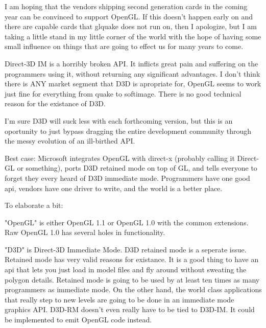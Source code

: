 \begin{allintypewriter}
\par
I am hoping that the vendors shipping second generation cards in the coming 
year can be convinced to support OpenGL. If this doesn't happen early on and
there are capable cards that glquake does not run on, then I apologize, but I am
taking a little stand in my little corner of the world with the hope of having 
some small influence on things that are going to effect us for many years to come.\\ 
\par
Direct-3D IM is a horribly broken API. It inflicts great pain and suffering on 
the programmers using it, without returning any significant advantages. I don't 
think there is ANY market segment that D3D is apropriate for, OpenGL seems to work
just fine for everything from quake to softimage. There is no good technical reason
for the existance of D3D.\\ 
\par
I'm sure D3D will suck less with each forthcoming version, but this is an oportunity 
to just bypass dragging the entire development community through the messy evolution 
of an ill-birthed API.\\ 
\par
Best case: Microsoft integrates OpenGL with direct-x (probably calling it Direct-GL 
or something), ports D3D retained mode on top of GL, and tells everyone to forget 
they every heard of D3D immediate mode. Programmers have one good api, vendors have 
one driver to write, and the world is a better place.\\ 
\par
To elaborate a bit:\\ 
\par
"OpenGL" is either OpenGL 1.1 or OpenGL 1.0 with the common extensions. Raw OpenGL 1.0
has several holes in functionality.\\ 
\par
"D3D" is Direct-3D Immediate Mode. D3D retained mode is a seperate issue. Retained 
mode has very valid reasons for existance. It is a good thing to have an api that 
lets you just load in model files and fly around without sweating the polygon details. 
Retained mode is going to be used by at least ten times as many programmers as 
immediate mode. On the other hand, the world class applications that really step to new 
levels are going to be done in an immediate mode graphics API. D3D-RM doesn't even really 
have to be tied to D3D-IM. It could be implemented to emit OpenGL code instead.\\ 

\end{allintypewriter}

